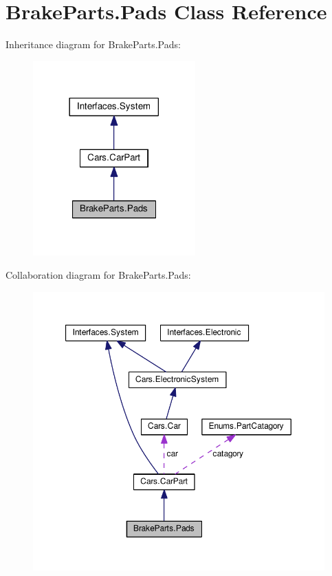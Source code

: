 \hypertarget{classBrakeParts_1_1Pads}{}\section{Brake\+Parts.\+Pads Class Reference}
\label{classBrakeParts_1_1Pads}


Inheritance diagram for Brake\+Parts.\+Pads\+:\nopagebreak
\begin{figure}[H]
\begin{center}
\leavevmode
\includegraphics[width=177pt]{classBrakeParts_1_1Pads__inherit__graph}
\end{center}
\end{figure}


Collaboration diagram for Brake\+Parts.\+Pads\+:\nopagebreak
\begin{figure}[H]
\begin{center}
\leavevmode
\includegraphics[width=350pt]{classBrakeParts_1_1Pads__coll__graph}
\end{center}
\end{figure}
